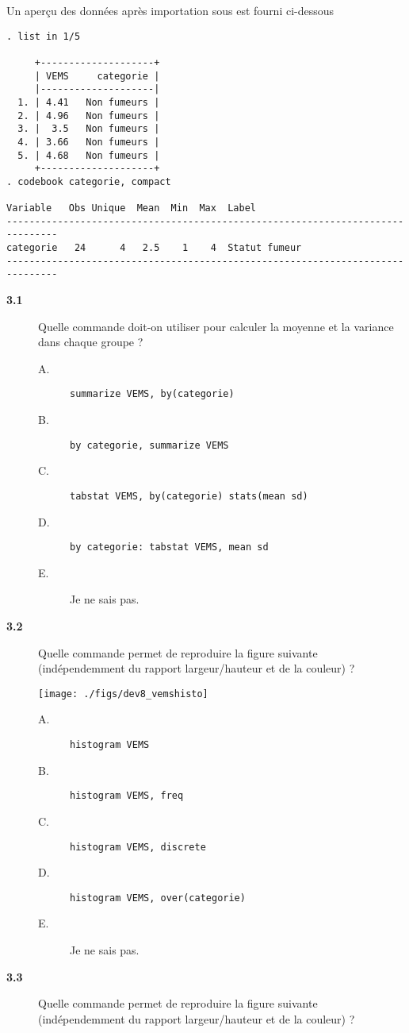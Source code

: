 Un aperçu des données après importation sous \Stata est fourni ci-dessous
\begin{verbatim}
. list in 1/5

     +--------------------+
     | VEMS     categorie |
     |--------------------|
  1. | 4.41   Non fumeurs |
  2. | 4.96   Non fumeurs |
  3. |  3.5   Non fumeurs |
  4. | 3.66   Non fumeurs |
  5. | 4.68   Non fumeurs |
     +--------------------+
. codebook categorie, compact

Variable   Obs Unique  Mean  Min  Max  Label
-------------------------------------------------------------------------------
categorie   24      4   2.5    1    4  Statut fumeur
-------------------------------------------------------------------------------
\end{verbatim}
\begin{description}
\item[\bf 3.1] Quelle commande doit-on utiliser pour calculer la moyenne et
  la variance dans chaque groupe ? 
  \begin{description}
  \item[A.] \verb|summarize VEMS, by(categorie)|
  \item[B.] \verb|by categorie, summarize VEMS|
  \item[C.] \verb|tabstat VEMS, by(categorie) stats(mean sd)|
  \item[D.] \verb|by categorie: tabstat VEMS, mean sd|
  \item[E.] Je ne sais pas.
  \end{description}  
\item[\bf 3.2] Quelle commande permet de reproduire la figure suivante
  (indépendemment du rapport largeur/hauteur et de la couleur) ?
\begin{center}
  \texttt{[image: ./figs/dev8\_vemshisto]}
\end{center}
\begin{description}
\item[A.] \verb|histogram VEMS|
\item[B.] \verb|histogram VEMS, freq|
\item[C.] \verb|histogram VEMS, discrete|
\item[D.] \verb|histogram VEMS, over(categorie)|
\item[E.] Je ne sais pas.
\end{description}
\item[\bf 3.3] Quelle commande permet de reproduire la figure suivante
  (indépendemment du rapport largeur/hauteur et de la couleur) ?

\end{description}
